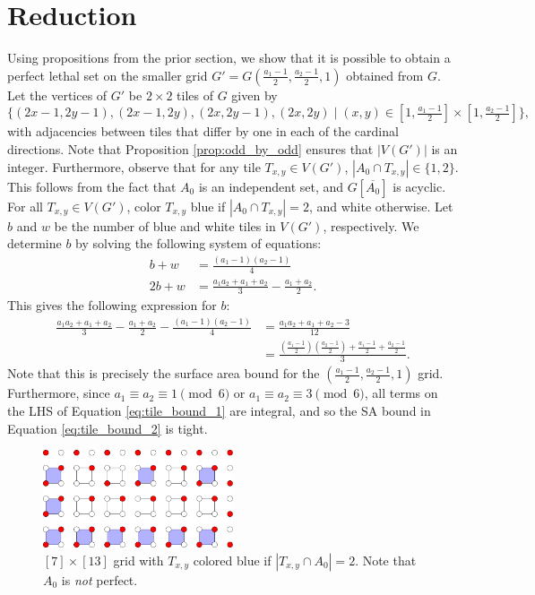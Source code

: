 \section{Reduction}
Using propositions from the prior section, we show that it is possible to obtain a perfect lethal set on the smaller grid $G' = G(\frac{a_1-1}{2}, \frac{a_2-1}{2}, 1)$ obtained from $G$. Let the vertices of $G'$ be $2 \times 2$ tiles of $G$ given by
$$\{(2x-1,2y-1),(2x-1,2y),(2x,2y-1),(2x,2y) \mid (x,y) \in [1, \tfrac{a_1-1}{2}] \times [1, \tfrac{a_2-1}{2}]\},$$
with adjacencies between tiles that differ by one in each of the cardinal directions. Note that Proposition \ref{prop:odd_by_odd} ensures that $|V(G')|$ is an integer. Furthermore, observe that for any tile $T_{x,y} \in V(G')$, $|A_0 \cap T_{x,y}| \in \{1,2\}$. This follows from the fact that $A_0$ is an independent set, and $G[\overline{A_0}]$ is acyclic. For all $T_{x,y} \in V(G')$, color $T_{x,y}$ blue if $|A_0 \cap T_{x,y}| = 2$, and white otherwise. Let $b$ and $w$ be the number of blue and white tiles in $V(G')$, respectively. We determine $b$ by solving the following system of equations:
\begin{align*}
b + w &= \frac{(a_1-1)(a_2-1)}{4} \\
2b + w &= \frac{a_1a_2+a_1+a_2}{3} - \frac{a_1+a_2}{2}.
\end{align*}
This gives the following expression for $b$:
\begin{align}
\frac{a_1a_2+a_1+a_2}{3} - \frac{a_1+a_2}{2} - \frac{(a_1-1)(a_2-1)}{4} &= \frac{a_1a_2+a_1+a_2-3}{12} \label{eq:tile_bound_1} \\
&= \frac{(\frac{a_1-1}{2})(\frac{a_2-1}{2}) + \frac{a_1-1}{2} + \frac{a_2-1}{2}}{3} \label{eq:tile_bound_2}.
\end{align}
Note that this is precisely the surface area bound for the $(\frac{a_1-1}{2}, \frac{a_2-1}{2}, 1)$ grid. Furthermore, since $a_1 \equiv a_2 \equiv 1 \pmod 6$ or $a_1 \equiv a_2 \equiv 3 \pmod 6$, all terms on the LHS of Equation \ref{eq:tile_bound_1} are integral, and so the SA bound in Equation \ref{eq:tile_bound_2} is tight.

\begin{figure}[]
\centering
\includegraphics[width=0.5\textwidth]{figures/6/tiles.pdf}
\caption{$[7] \times [13]$ grid with $T_{x,y}$ colored blue if $|T_{x,y} \cap A_0| = 2$. Note that $A_0$ is \emph{not} perfect.}
\label{fig:tiles}
\end{figure} 

